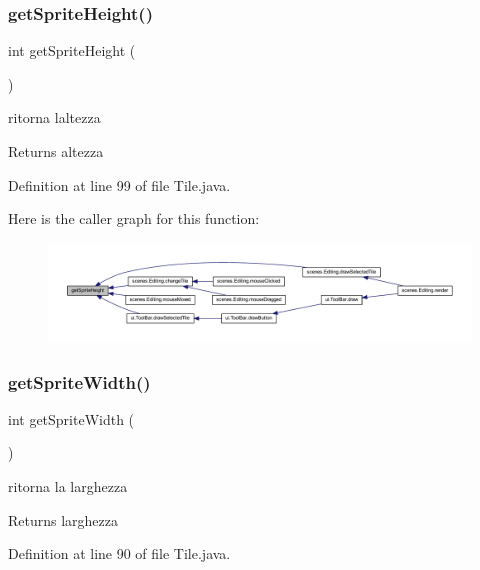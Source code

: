 \subsubsection{\texorpdfstring{get\+Sprite\+Height()}{getSpriteHeight()}}
{\footnotesize\ttfamily int get\+Sprite\+Height (\begin{DoxyParamCaption}{ }\end{DoxyParamCaption})}



ritorna l\textquotesingle{}altezza 

\begin{DoxyReturn}{Returns}
altezza 
\end{DoxyReturn}


Definition at line 99 of file Tile.\+java.

Here is the caller graph for this function\+:\nopagebreak
\begin{figure}[H]
\begin{center}
\leavevmode
\includegraphics[width=350pt]{classobjects_1_1_tile_af71d2cd2060d5ecee3b0a8c387b981dd_icgraph}
\end{center}
\end{figure}
\mbox{\label{classobjects_1_1_tile_a57c0bcd3471b12679b57faa7ba32d91c}} 
\subsubsection{\texorpdfstring{get\+Sprite\+Width()}{getSpriteWidth()}}
{\footnotesize\ttfamily int get\+Sprite\+Width (\begin{DoxyParamCaption}{ }\end{DoxyParamCaption})}



ritorna la larghezza 

\begin{DoxyReturn}{Returns}
larghezza 
\end{DoxyReturn}


Definition at line 90 of file Tile.\+java.

